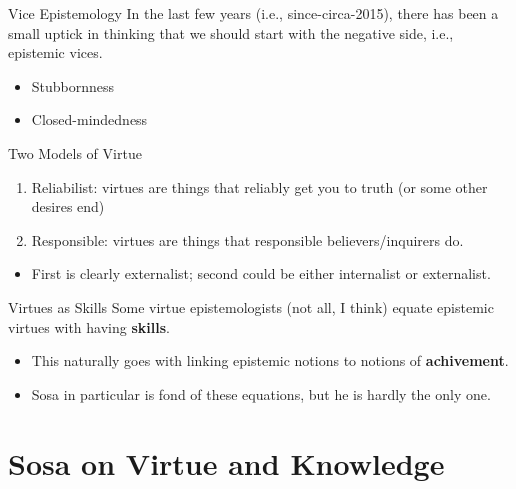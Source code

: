 \documentclass[
  17pt,
  letterpaper,
  ignorenonframetext,
  aspectratio=169,
]{beamer}
\providecommand{\tightlist}{%
  \setlength{\itemsep}{0pt}\setlength{\parskip}{0pt}}\usepackage{longtable,booktabs,array}
\begin{document}
\begin{frame}{Vice Epistemology}
\protect\hypertarget{vice-epistemology}{}
In the last few years (i.e., since-circa-2015), there has been a small
uptick in thinking that we should start with the negative side, i.e.,
epistemic vices.

\begin{itemize}[<+->]
\tightlist
\item
  Stubbornness
\item
  Closed-mindedness
\end{itemize}
\end{frame}

\begin{frame}{Two Models of Virtue}
\protect\hypertarget{two-models-of-virtue}{}
\begin{enumerate}[<+->]
\tightlist
\item
  Reliabilist: virtues are things that reliably get you to truth (or
  some other desires end)
\item
  Responsible: virtues are things that responsible believers/inquirers
  do.
\end{enumerate}

\begin{itemize}[<+->]
\tightlist
\item
  First is clearly externalist; second could be either internalist or
  externalist.
\end{itemize}
\end{frame}

\begin{frame}{Virtues as Skills}
\protect\hypertarget{virtues-as-skills}{}
Some virtue epistemologists (not all, I think) equate epistemic virtues
with having \textbf{skills}.

\begin{itemize}[<+->]
\tightlist
\item
  This naturally goes with linking epistemic notions to notions of
  \textbf{achivement}.
\item
  Sosa in particular is fond of these equations, but he is hardly the
  only one.
\end{itemize}
\end{frame}

\hypertarget{sosa-on-virtue-and-knowledge}{%
\section{Sosa on Virtue and
Knowledge}\label{sosa-on-virtue-and-knowledge}}
\end{document}
